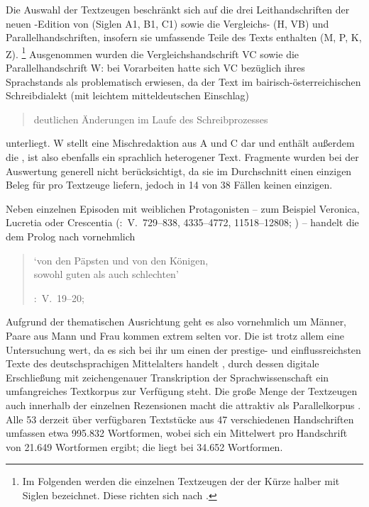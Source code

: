 Die Auswahl der Textzeugen beschränkt sich auf die drei
Leithandschriften der neuen \KC{}-Edition von
\citeauthor{chincaetal2019b} (Siglen A1, B1, C1) sowie die Vergleichs- (H, VB)
und Parallelhandschriften, insofern sie umfassende Teile des
Texts enthalten (M, P, K, Z).%
%
	\footnote{Im Folgenden werden die einzelnen Textzeugen der \KC{} der
	Kürze halber mit Siglen bezeichnet. Diese richten sich nach
	 \autocite{kcdigital}.}
%
Ausgenommen wurden die Vergleichshandschrift VC sowie die
Parallelhandschrift W: bei Vorarbeiten hatte sich VC bezüglich
ihres Sprachstands als problematisch erwiesen, da der Text im
bairisch-österreichischen Schreibdialekt (mit leichtem
mitteldeutschen Einschlag)
\blockcquote[73]{wolf:kckat}{deutlichen Änderungen im Laufe des
Schreibprozesses} unterliegt. W stellt eine Mischredaktion aus A und C dar und
enthält außerdem die  \autocite[48--54]{weis2022},
ist also ebenfalls ein sprachlich heterogener Text. Fragmente wurden bei der
Auswertung generell nicht berücksichtigt, da sie im Durchschnitt einen einzigen
Beleg für  pro Textzeuge liefern, jedoch in 14 von 38 Fällen keinen
einzigen.

Neben einzelnen Episoden mit weiblichen Protagonisten -- zum Beispiel Veronica,
Lucretia oder Crescentia (\KC:~V.~729--838, 4335--4772, 11518--12808;
\cite[vgl.][94--96, 161--169, 292--314]{schroeder1895}) -- handelt die \KC{} dem
Prolog nach vornehmlich

\blockquote[{\KC:~V.~19--20; \cite[79]{schroeder1895}}]{

	`von den Päpsten und von den Königen,\\
	sowohl guten als auch schlechten'
}

Aufgrund der thematischen Ausrichtung geht es also vornehmlich um Männer, Paare
aus Mann und Frau kommen extrem selten vor. Die \KC{} ist trotz allem eine
Untersuchung wert, da es sich bei ihr um einen der prestige- und
einflussreichsten Texte des deutschsprachigen Mittelalters handelt
\autocite[93]{wolf2008}, durch dessen digitale Erschließung mit zeichengenauer
Transkription \autocite{kcdigital} der Sprachwissenschaft ein umfangreiches
Textkorpus zur Verfügung steht. Die große Menge der Textzeugen auch
innerhalb der einzelnen Rezensionen macht die \KC{} attraktiv als
Parallelkorpus \autocite{cysouwwaelchli2007}. Alle 53 derzeit
über  verfügbaren Textstücke aus 47 verschiedenen
Handschriften umfassen etwa 995.832 Wortformen, wobei sich ein Mittelwert pro
Handschrift von 21.649 Wortformen ergibt; die  liegt
bei 34.652 Wortformen.

